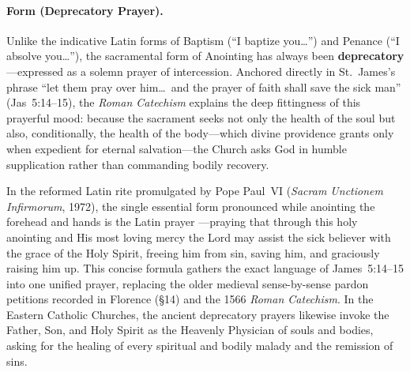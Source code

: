 \paragraph{Form (Deprecatory Prayer).}
Unlike the indicative Latin forms of Baptism (``I baptize you\ldots'') and Penance (``I absolve you\ldots''), the sacramental form of Anointing has always been \textbf{deprecatory}---expressed as a solemn prayer of intercession. Anchored directly in St.~James's phrase ``let them pray over him\ldots\ and the prayer of faith shall save the sick man'' (Jas~5:14--15), the \emph{Roman Catechism} explains the deep fittingness of this prayerful mood: because the sacrament seeks not only the health of the soul but also, conditionally, the health of the body---which divine providence grants only when expedient for eternal salvation---the Church asks God in humble supplication rather than commanding bodily recovery.

In the reformed Latin rite promulgated by Pope Paul~VI (\emph{Sacram Unctionem Infirmorum}, 1972), the single essential form pronounced while anointing the forehead and hands is the Latin prayer ---praying that through this holy anointing and His most loving mercy the Lord may assist the sick believer with the grace of the Holy Spirit, freeing him from sin, saving him, and graciously raising him up. This concise formula gathers the exact language of James~5:14--15 into one unified prayer, replacing the older medieval sense-by-sense pardon petitions recorded in Florence (\S14) and the 1566 \emph{Roman Catechism}. In the Eastern Catholic Churches, the ancient deprecatory prayers likewise invoke the Father, Son, and Holy Spirit as the Heavenly Physician of souls and bodies, asking for the healing of every spiritual and bodily malady and the remission of sins.

